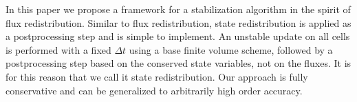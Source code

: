 In this paper we propose a framework for a stabilization algorithm in
the spirit of flux redistribution. Similar to flux redistribution, state redistribution is applied as a postprocessing step and is simple to implement. An unstable update on all cells is performed with a fixed $\Delta t$ using a base finite volume scheme, followed by a postprocessing step based on the conserved state variables, not on the fluxes.  It is for this reason that we call it state redistribution.  Our approach is fully conservative and can be generalized to arbitrarily high order accuracy.



